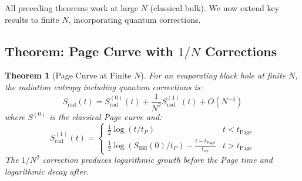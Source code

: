 \documentclass[12pt,a4paper]{article}
\newtheorem{theorem}{Theorem}[section]
\begin{document}
All preceding theorems work at large $N$ (classical bulk). We now extend key results to finite $N$, incorporating quantum corrections.

\subsection{Theorem: Page Curve with $1/N$ Corrections}

\begin{theorem}[Page Curve at Finite $N$]\label{thm:page-curve-finiteN}
For an evaporating black hole at finite $N$, the radiation entropy including quantum corrections is:
\begin{equation}
S_{\text{rad}}(t) = S_{\text{rad}}^{(0)}(t) + \frac{1}{N^2} S_{\text{rad}}^{(1)}(t) + O(N^{-4})
\end{equation}
where $S^{(0)}$ is the classical Page curve and:
\begin{equation}
S_{\text{rad}}^{(1)}(t) = \begin{cases}
\frac{1}{2}\log(t/t_P) & t < t_{\text{Page}} \\
\frac{1}{2}\log(S_{\text{BH}}(0)/t_P) - \frac{t - t_{\text{Page}}}{t_{\text{scr}}} & t > t_{\text{Page}}
\end{cases}
\end{equation}
The $1/N^2$ correction produces logarithmic growth before the Page time and logarithmic decay after.
\end{theorem}
\end{document}
